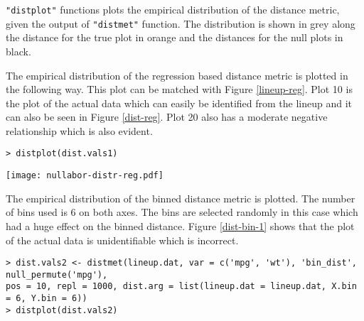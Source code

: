 \texttt{"distplot"} functions plots the empirical distribution of the
distance metric, given the output of \texttt{"distmet"} function. The
distribution is shown in grey along the distance for the true plot in
orange and the distances for the null plots in black.

\newpage

The empirical distribution of the regression based distance metric is plotted in the following way. This plot can be matched with Figure \ref{lineup-reg}. Plot 10 is the plot of the actual data which can easily be identified from the lineup and it can also be seen in Figure \ref{dist-reg}. Plot 20 also has a moderate negative relationship which is also evident. 

\begin{verbatim}
> distplot(dist.vals1)
\end{verbatim}

\begin{figure*}[hbtp]
\begin{center}
\texttt{[image: nullabor-distr-reg.pdf]}
\caption{Distribution of the \textbf{regression based distance} with the distance for the null plots of the lineup represented in black and the distance for the plot of the actual data represented by orange. The distance for the actual plot is much higher than the null plots and the actual plot can be easily identified as seen in Figure \ref{lineup-reg}. }
\label{dist-reg}
\end{center}
\end{figure*}

\newpage

The empirical distribution of the binned distance metric is plotted. The number of bins used is 6 on both axes. The bins are selected randomly in this case which had a huge effect on the binned distance. Figure \ref{dist-bin-1} shows that the plot of the actual data is unidentifiable which is incorrect. 

\begin{verbatim}
> dist.vals2 <- distmet(lineup.dat, var = c('mpg', 'wt'), 'bin_dist', null_permute('mpg'), 
pos = 10, repl = 1000, dist.arg = list(lineup.dat = lineup.dat, X.bin = 6, Y.bin = 6))
> distplot(dist.vals2)
\end{verbatim}

